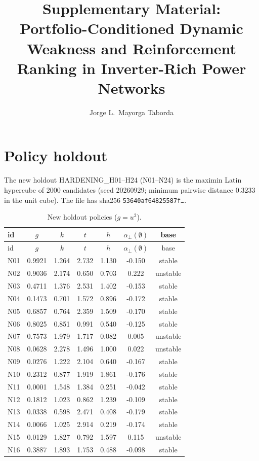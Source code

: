 \documentclass[10pt,a4paper]{article}
\title{Supplementary Material:\\ Portfolio-Conditioned Dynamic Weakness and Reinforcement Ranking in Inverter-Rich Power Networks}
\author{Jorge L.~Mayorga Taborda}
\date{}
\newcommand{\aperp}{\alpha_{\perp}}
\begin{document}
\maketitle
\section{Policy holdout}
The new holdout HARDENING\_H01--H24 (N01--N24) is the maximin Latin hypercube of 2000 candidates (seed 20260929; minimum pairwise distance 0.3233 in the unit cube). The file  has sha256 \texttt{53640af64825587f\ldots}.

{\scriptsize
\begin{longtable}{lcccccc}
\caption{New holdout policies ($g=u^2$).}\label{tab:s-pol}\\
\toprule
id & $g$ & $k$ & $t$ & $h$ & $\aperp(\emptyset)$ & base \\
\midrule
\endfirsthead
\toprule
id & $g$ & $k$ & $t$ & $h$ & $\aperp(\emptyset)$ & base \\
\midrule
\endhead
N01 & 0.9921 & 1.264 & 2.732 & 1.130 & -0.150 & stable \\
N02 & 0.9036 & 2.174 & 0.650 & 0.703 & 0.222 & unstable \\
N03 & 0.4711 & 1.376 & 2.531 & 1.402 & -0.153 & stable \\
N04 & 0.1473 & 0.701 & 1.572 & 0.896 & -0.172 & stable \\
N05 & 0.6857 & 0.764 & 2.359 & 1.509 & -0.170 & stable \\
N06 & 0.8025 & 0.851 & 0.991 & 0.540 & -0.125 & stable \\
N07 & 0.7573 & 1.979 & 1.717 & 0.082 & 0.005 & unstable \\
N08 & 0.0628 & 2.278 & 1.496 & 1.000 & 0.022 & unstable \\
N09 & 0.0276 & 1.222 & 2.104 & 0.640 & -0.167 & stable \\
N10 & 0.2312 & 0.877 & 1.919 & 1.861 & -0.176 & stable \\
N11 & 0.0001 & 1.548 & 1.384 & 0.251 & -0.042 & stable \\
N12 & 0.1812 & 1.023 & 0.862 & 1.239 & -0.109 & stable \\
N13 & 0.0338 & 0.598 & 2.471 & 0.408 & -0.179 & stable \\
N14 & 0.0066 & 1.025 & 2.914 & 0.219 & -0.174 & stable \\
N15 & 0.0129 & 1.827 & 0.792 & 1.597 & 0.115 & unstable \\
N16 & 0.3887 & 1.893 & 1.753 & 0.488 & -0.098 & stable \\

\end{longtable}}
\end{document}
